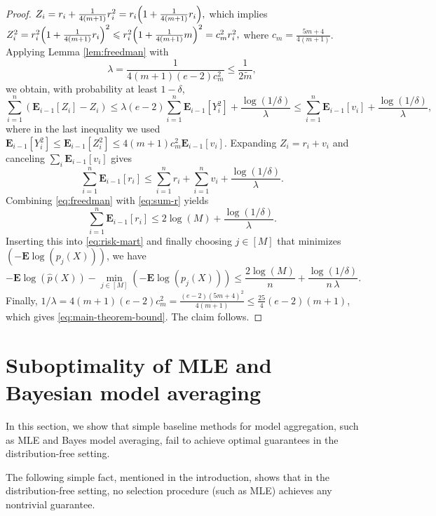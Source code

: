 \documentclass[11pt]{article}
\newcommand{\E}{{\mathbf E}}
\renewcommand{\le}{\leqslant}
\theoremstyle{definition}
\theoremstyle{remark}
\begin{document}
\begin{proof}
$
Z_i=r_i+\frac{1}{4(m+1)}r_i^2=r_i\Bigl(1+\frac{1}{4(m+1)}r_i\Bigr),
$
which implies
$
Z_i^2=r_i^2\Bigl(1+\frac{1}{4(m+1)}r_i\Bigr)^2\le r_i^2\Bigl(1+\frac{1}{4(m+1)}m\Bigr)^2=c_m^2 r_i^2,
$
where $c_m=\frac{5m+4}{4(m+1)}$. Applying Lemma \ref{lem:freedman} with 
\[
\lambda=\frac{1}{4\left(m+1\right)\left(e-2\right)c_m^2}\le \frac{1}{2\widetilde{m}},
\]
we obtain, with probability at least $1-\delta$,
\[
\sum_{i=1}^{n}\left(\E_{i-1}\left[Z_i\right]-Z_i\right)\le \lambda\left(e-2\right)\sum_{i=1}^{n}\E_{i-1}\left[Y_i^2\right]+\frac{\log\left(1/\delta\right)}{\lambda}
\le \sum_{i=1}^{n}\E_{i-1}\left[v_i\right]+\frac{\log\left(1/\delta\right)}{\lambda},
\]
where in the last inequality we used $\E_{i-1}[Y_i^2] \le \E_{i - 1}[Z_i^2] \le 4(m+1)c_m^2\E_{i - 1}[v_i]$.
Expanding $Z_i=r_i+v_i$ and canceling $\sum_{i}\E_{i-1}\left[v_i\right]$ gives
\begin{equation}\label{eq:freedman}
\sum_{i=1}^{n}\E_{i-1}[r_i]\le \sum_{i=1}^{n}r_i+\sum_{i=1}^{n}v_i+\frac{\log\left(1/\delta\right)}{\lambda}.
\end{equation}
Combining \eqref{eq:freedman} with \eqref{eq:sum-r} yields
\[
\sum_{i=1}^{n}\E_{i-1}[r_i]\le 2\log\left(M\right)+\frac{\log\left(1/\delta\right)}{\lambda}.
\]
Inserting this into \eqref{eq:risk-mart} and finally choosing $j\in[M]$ that minimizes $\left(-\E\log\left(p_j(X)\right)\right)$, we have
\[
-\E\log\left(\widehat p(X)\right)-\min_{j\in[M]}\left(-\E\log\left(p_j(X)\right)\right)\le \frac{2\log\left(M\right)}{n}+\frac{\log\left(1/\delta\right)}{n\,\lambda}.
\]
Finally, $1/\lambda=4\left(m+1\right)\left(e-2\right)c_m^2=\frac{\left(e-2\right)\left(5m+4\right)^2}{4\left(m+1\right)}\le \frac{25}{4}\left(e-2\right)\left(m+1\right)$, which gives \eqref{eq:main-theorem-bound}. The claim follows.
\end{proof}


\section{Suboptimality of MLE and
  Bayesian model averaging}
\label{sec:suboptimal}

In this section, we show that simple baseline methods for model aggregation, such as MLE and Bayes model averaging, fail to achieve optimal guarantees in the distribution-free setting.


The following simple fact, mentioned in the introduction, shows that in the distribution-free setting, no selection procedure (such as MLE) achieves any nontrivial guarantee.
\end{document}
